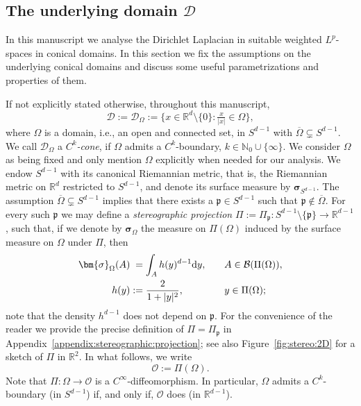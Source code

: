 \documentclass[12pt,a4paper, reqno]{amsart}
\theoremstyle{plain}
\theoremstyle{definition}
\theoremstyle{remark}
\numberwithin{equation}{section}
\newcommand{\1}{\mathbbm{1}}
\newcommand{\dd}{\textup{d}}
\newcommand{\R}{\ensuremath{\mathbb{R}}}
\newcommand{\N}{\ensuremath{\mathbb{N}}}
\newcommand{\calO}{\ensuremath{\mathcal{O}}}
\newcommand{\calD}{\ensuremath{\mathcal{D}}}
\newcommand{\calB}{\ensuremath{\mathcal{B}}}
\begin{document}
\subsection{The underlying domain \texorpdfstring{$\calD$}{D}}\label{sec:domain:D}
In this manuscript we analyse the Dirichlet Laplacian in suitable weighted $L^p$-spaces in conical domains. 
In this section we fix the assumptions on the underlying conical domains and discuss some useful parametrizations and properties of them.

If not explicitly stated otherwise, throughout this manuscript,   
\begin{equation}\label{eq:D:convention}
\calD :=
\calD_\Omega :=
\{x\in\R^d\setminus\{0\}\colon \tfrac{x}{|x|}\in \Omega\},
\end{equation}
where $\Omega$ is a  domain, i.e., an open and connected set, in $S^{d-1}$ with $\overline{\Omega}\subsetneq S^{d-1}$. 
We call $\calD_\Omega$  a \emph{$C^k$-cone}, if $\Omega$ admits a $C^k$-boundary, $k\in \N_0\cup\{\infty\}$. We consider $\Omega$ as being fixed and only mention $\Omega$ explicitly when needed for our analysis.
%
We endow $S^{d-1}$ with its canonical Riemannian metric, that is, the Riemannian metric on $\R^d$ restricted to $S^{d-1}$, and denote its surface measure by $\bm\sigma_{S^{d-1}}$.
The assumption $\overline{\Omega}\subsetneq S^{d-1}$ implies that there exists a $\mathfrak{p}\in S^{d-1}$ such that $\mathfrak{p}\notin \overline\Omega$. 
For every such $\mathfrak{p}$ we may define a \emph{stereographic projection} $\Pi:=\Pi_{\mathfrak{p}}\colon S^{d-1}\setminus\{\mathfrak{p}\}\to \R^{d-1}$, such that, if we denote by $\bm\sigma_\Omega$ the measure on $\Pi(\Omega)$ induced by the surface measure on $\Omega$ under $\Pi$, then
\begin{equation}\label{eq:surface:measure:stereographic:projection}
    \begin{aligned}
    \bm{\sigma}_{\Omega}(A)&\phantom{:}= \int_A h(y)^{d-1}\dd y, \quad &&A\in \calB(\Pi(\Omega)),\\
    h(y)&:= \frac{2}{1+|y|^2}, \quad &&y\in \Pi(\Omega);
\end{aligned}
\end{equation}
note that the density $h^{d-1}$ does not depend on $\mathfrak{p}$. For the convenience of the reader we provide the precise definition of $\Pi=\Pi_\mathfrak{p}$ in Appendix~\ref{appendix:stereographic:projection}; see also Figure~\ref{fig:stereo:2D} for a sketch of $\Pi$ in $\R^2$.
In what follows, we write $$\calO:= \Pi(\Omega).$$ 
Note that $\Pi\colon\Omega\to\calO$ is a $C^\infty$-diffeomorphism. In particular, $\Omega$ admits a $C^k$-boundary (in $S^{d-1}$) if, and only if, $\calO$ does (in $\R^{d-1}$).
\end{document}
